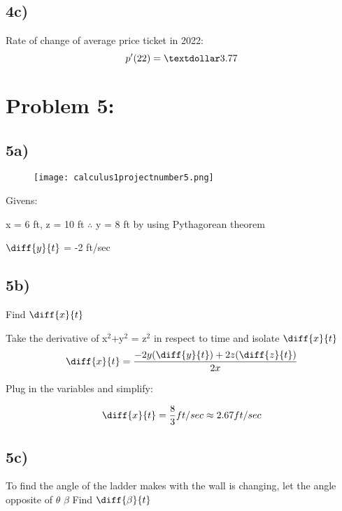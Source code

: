 \documentclass{article}
\begin{document}
\subsection*{4c)} Rate of change of average price ticket in 2022:
\begin{equation}
    p'(22) = \textdollar3.77
\end{equation}

\newpage

\section*{Problem 5:}

\subsection*{5a)}

\begin{figure}[ht]
\centering
\texttt{[image: calculus1projectnumber5.png]}
\end{figure}

Givens:

x = 6 ft, z = 10 ft $\therefore$ y = 8 ft by using Pythagorean theorem

$\diff{y}{t}$ = -2 ft/sec

\subsection*{5b)}
Find $\diff{x}{t}$

Take the derivative of x$^2$+y$^2$ = z$^2$ in respect to time and isolate $\diff{x}{t}$
\begin{equation}
    \diff{x}{t} = \frac{-2y(\diff{y}{t}) + 2z(\diff{z}{t})}{2x}
\end{equation}

Plug in the variables and simplify:

\begin{equation}
    \diff{x}{t} = \frac{8}{3} ft/sec \approx 2.67 ft/sec
\end{equation}

\subsection*{5c)}
To find the angle of the ladder makes with the wall is changing, let the angle opposite of $\theta$ $\beta$
\newline Find $\diff{\beta}{t}$
\end{document}
